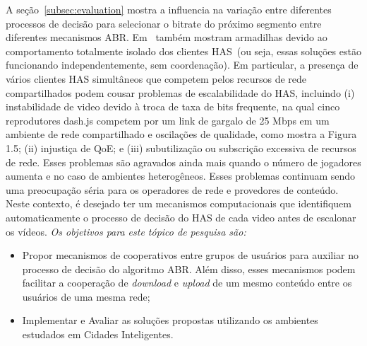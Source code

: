 A seção~\ref{subsec:evaluation} mostra a influencia na variação entre diferentes processos de decisão para selecionar o bitrate do próximo segmento entre diferentes mecanismos ABR. Em~\cite{bentaleb:2018:MSys} também mostram armadilhas devido ao comportamento totalmente isolado dos clientes HAS~(ou seja, essas soluções estão funcionando independentemente, sem coordenação). Em particular, a presença de vários clientes HAS simultâneos que competem pelos recursos de rede compartilhados podem cousar problemas de escalabilidade do HAS, incluindo (i) instabilidade de video devido à troca de taxa de bits frequente, na qual cinco reprodutores dash.js competem por um link de gargalo de 25 Mbps em um ambiente de rede compartilhado e oscilações de qualidade, como mostra a Figura 1.5; (ii) injustiça de QoE; e (iii) subutilização ou subscrição excessiva de recursos de rede. Esses problemas são agravados ainda mais quando o número de jogadores aumenta e no caso de ambientes heterogêneos. Esses problemas continuam sendo uma preocupação séria para os operadores de rede e provedores de conteúdo. 
Neste contexto, é desejado ter um mecanismos computacionais que identifiquem automaticamente o processo de decisão do HAS de cada video antes de escalonar os vídeos.
\textit{Os objetivos para este tópico de pesquisa são:}

\begin{itemize}
    \item Propor mecanismos de cooperativos entre grupos de usuários para auxiliar no processo de decisão do algoritmo ABR. Além disso, esses mecanismos podem facilitar a cooperação de \textit{download} e \textit{upload} de um mesmo conteúdo entre os usuários de uma mesma rede; 
    \item Implementar e Avaliar as soluções propostas utilizando os ambientes estudados em Cidades Inteligentes.
\end{itemize}



